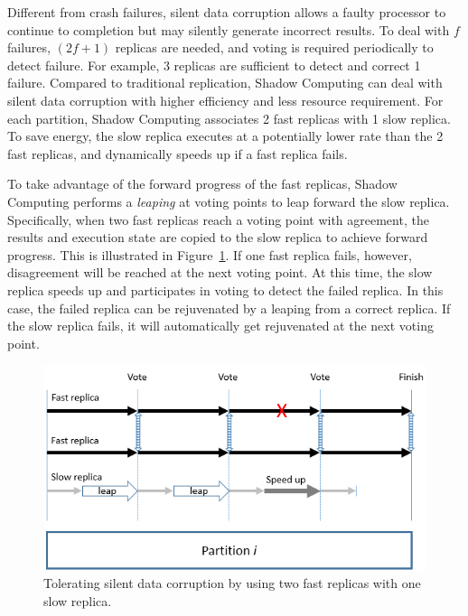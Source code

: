 Different from crash failures, silent data corruption allows a faulty processor to continue to completion but may silently generate incorrect results. To deal with $f$ failures, $(2f+1)$ replicas are needed, and voting is required periodically to detect failure. For example, 3 replicas are sufficient to detect and correct 1 failure. %
Compared to traditional replication, Shadow Computing can deal with silent data corruption with higher efficiency and less resource requirement. For each partition, Shadow Computing associates 2 fast replicas with 1 slow replica. To save energy, the slow replica executes at a potentially lower rate than the 2 fast replicas, and dynamically speeds up if a fast replica fails. 

To take advantage of the forward progress of the fast replicas, Shadow Computing performs a \textit{leaping} at voting points to leap forward the slow replica. Specifically, when two fast replicas reach a voting point with agreement, the results and execution state are copied to the slow replica to achieve forward progress. This is illustrated in Figure~\ref{fig:silent_model}. If one fast replica fails, however, disagreement will be reached at the next voting point. At this time, the slow replica speeds up and participates in voting to detect the failed replica. In this case, the failed replica can be rejuvenated by a leaping from a correct replica. If the slow replica fails, it will automatically get rejuvenated at the next voting point. 

\begin{figure}[!t]
  \begin{center}
      \includegraphics[width=0.8\columnwidth]{figures/silent_model}
  \end{center}
  \vskip -0.1in
  \caption{Tolerating silent data corruption by using two fast replicas with one slow replica.}
  \label{fig:silent_model}
  \vspace{-0.1in}
\end{figure}

